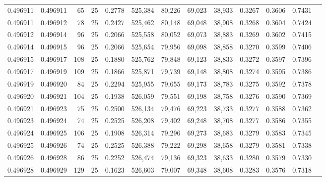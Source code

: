 \begin{tabular}{rrrrrrrrrrrrr}
0.496911 & 0.496911 &    65 &  25 &                                     0.2778 & 525,384 &  80,226 &  69,023 &  38,933 & 0.3267 & 0.3606 & 0.7431 \\
0.496911 & 0.496912 &    78 &  25 &                                     0.2427 & 525,462 &  80,148 &  69,048 &  38,908 & 0.3268 & 0.3604 & 0.7424 \\
0.496912 & 0.496914 &    96 &  25 &                                     0.2066 & 525,558 &  80,052 &  69,073 &  38,883 & 0.3269 & 0.3602 & 0.7415 \\
0.496914 & 0.496915 &    96 &  25 &                                     0.2066 & 525,654 &  79,956 &  69,098 &  38,858 & 0.3270 & 0.3599 & 0.7406 \\
0.496915 & 0.496917 &   108 &  25 &                                     0.1880 & 525,762 &  79,848 &  69,123 &  38,833 & 0.3272 & 0.3597 & 0.7396 \\
0.496917 & 0.496919 &   109 &  25 &                                     0.1866 & 525,871 &  79,739 &  69,148 &  38,808 & 0.3274 & 0.3595 & 0.7386 \\
0.496919 & 0.496920 &    84 &  25 &                                     0.2294 & 525,955 &  79,655 &  69,173 &  38,783 & 0.3275 & 0.3592 & 0.7378 \\
0.496920 & 0.496921 &   104 &  25 &                                     0.1938 & 526,059 &  79,551 &  69,198 &  38,758 & 0.3276 & 0.3590 & 0.7369 \\
0.496921 & 0.496923 &    75 &  25 &                                     0.2500 & 526,134 &  79,476 &  69,223 &  38,733 & 0.3277 & 0.3588 & 0.7362 \\
0.496923 & 0.496924 &    74 &  25 &                                     0.2525 & 526,208 &  79,402 &  69,248 &  38,708 & 0.3277 & 0.3586 & 0.7355 \\
0.496924 & 0.496925 &   106 &  25 &                                     0.1908 & 526,314 &  79,296 &  69,273 &  38,683 & 0.3279 & 0.3583 & 0.7345 \\
0.496925 & 0.496926 &    74 &  25 &                                     0.2525 & 526,388 &  79,222 &  69,298 &  38,658 & 0.3279 & 0.3581 & 0.7338 \\
0.496926 & 0.496928 &    86 &  25 &                                     0.2252 & 526,474 &  79,136 &  69,323 &  38,633 & 0.3280 & 0.3579 & 0.7330 \\
0.496928 & 0.496929 &   129 &  25 &                                     0.1623 & 526,603 &  79,007 &  69,348 &  38,608 & 0.3283 & 0.3576 & 0.7318 \\

\end{tabular}

